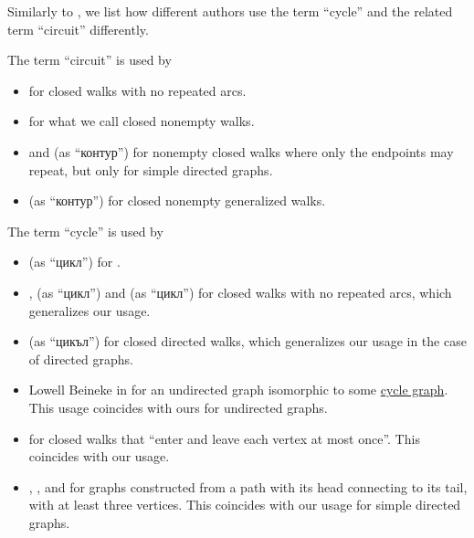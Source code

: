 \begin{remark}\label{rem:graph_cycle_terminology}
  Similarly to , we list how different authors use the term \enquote{cycle} and the related term \enquote{circuit} differently.

  \begin{thmenum}
     The term \enquote{circuit} is used by
    \begin{itemize}
      \item {} for closed walks with no repeated arcs.
      \item {} for what we call closed nonempty walks.
      \item {} and  (as \enquote{контур}) for nonempty closed walks where only the endpoints may repeat, but only for simple directed graphs.
      \item {} (as \enquote{контур}) for closed nonempty generalized walks.
    \end{itemize}

     The term \enquote{cycle} is used by
    \begin{itemize}
      \item {} (as \enquote{цикл}) for .

      \item {},  (as \enquote{цикл}) and  (as \enquote{цикл}) for closed walks with no repeated arcs, which generalizes our usage.

      \item {} (as \enquote{цикъл}) for closed directed walks, which generalizes our usage in the case of directed graphs.

      \item Lowell Beineke in \cite[550]{Rosen1999} for an undirected graph isomorphic to some \hyperref[def:cycle_graph]{cycle graph}. This usage coincides with ours for undirected graphs.

      \item {} for closed walks that \enquote{enter and leave each vertex at most once}. This coincides with our usage.

      \item {}, ,  and  for graphs constructed from a path with its head connecting to its tail, with at least three vertices. This coincides with our usage for simple directed graphs.


\end{itemize}
\end{thmenum}
\end{remark}

